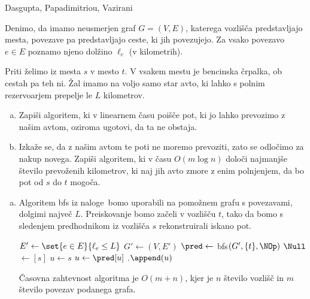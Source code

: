 \begin{naloga}%
{Dasgupta, Papadimitriou, Vazirani}{\cite[Exercise~4.13]{dpv}}
\begin{vprasanje}
Denimo, da imamo neusmerjen graf $G = (V, E)$,
katerega vozlišča pred\-stav\-lja\-jo mesta,
povezave pa predstavljajo ceste, ki jih povezujejo.
Za vsako povezavo $e \in E$ poznamo njeno dolžino $\ell_e$ (v kilometrih).

Priti želimo iz mesta $s$ v mesto $t$.
V vsakem mestu je bencinska črpalka, ob cestah pa teh ni.
Žal imamo na voljo samo star avto,
ki lahko s polnim rezervoarjem prepelje le $L$ kilometrov.
\begin{enumerate}[(a)]
\item Zapiši algoritem, ki v linearnem času poišče pot,
ki jo lahko prevozimo z našim avtom,
oziroma ugotovi, da ta ne obstaja.
\item Izkaže se, da z našim avtom te poti ne moremo prevoziti,
zato se odločimo za nakup novega.
Zapiši algoritem, ki v času $O(m \log n)$
določi najmanjše število prevoženih kilometrov,
ki naj jih avto zmore z enim polnjenjem,
da bo pot od $s$ do $t$ mogoča.
\end{enumerate}
\end{vprasanje}

\begin{odgovor}
\begin{enumerate}[(a)]
\item Algoritem {\sc bfs} iz naloge~\res[bfs]
bomo uporabili na pomožnem grafu s povezavami,
dolgimi največ $L$.
Preiskovanje bomo začeli v vozlišču $t$,
tako da bomo s sledenjem predhodnikom iz vozlišča $s$
rekonstruirali iskano pot.
\begin{small}
\begin{algorithmic}
    \State $E' \gets \set{e \in E}{\ell_e \le L}$
    \State $G' \gets (V, E')$
    \State $\pred \gets$ {\sc bfs}$(G', \{t\}, \NOp)$
        \State \Return $\Null$
    \EndIf
     $\gets [s]$
    \State $u \gets s$
    \While{$\pred[u] \ne \Null$}
        \State $u \gets \pred[u]$
        .$\append(u)$
    \EndWhile
    \State {}
\EndFunction
\end{algorithmic}
\end{small}
Časovna zahtevnost algoritma je $O(m+n)$,
kjer je $n$ število vozlišč in $m$ število povezav podanega grafa.


\end{enumerate}
\end{odgovor}
\end{naloga}
